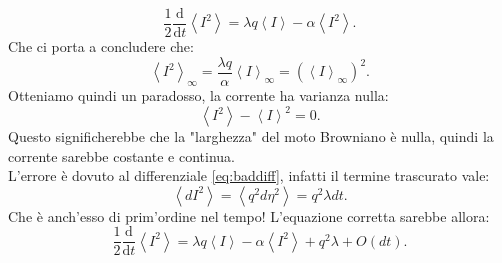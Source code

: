 \[
    \frac{1}{2}\frac{\text{d} }{\text{d} t} \left<I^2\right>= \lambda q\left<I\right>-\alpha\left<I^2\right>
.\] 
Che ci porta a concludere che:
\[
    \left<I^2\right>_{\infty} = \frac{\lambda q}{\alpha}\left<I\right>_{\infty} = \left(\left<I\right>_{\infty}\right)^2
.\] 
Otteniamo quindi un paradosso, la corrente ha varianza nulla:
\[
  \left<I^2\right>-\left<I\right>^2 = 0  
.\] 
Questo significherebbe che la "larghezza" del moto Browniano è nulla, quindi la corrente sarebbe costante e continua.\\
L'errore è dovuto al differenziale \ref{eq:baddiff}, infatti il termine trascurato vale:
\[
    \left<dI^2\right> = \left<q^2d\eta^2\right> = q^2\lambda dt
.\] 
Che è anch'esso di prim'ordine nel tempo! L'equazione corretta sarebbe allora:
\[
    \frac{1}{2}\frac{\text{d} }{\text{d} t} \left<I^2\right>= \lambda q\left<I\right>-\alpha\left<I^2\right> + q^2\lambda + O(dt)
.\]



\newpage
